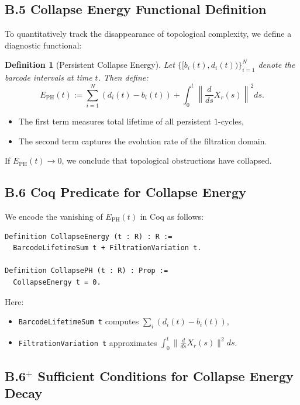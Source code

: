 \documentclass[11pt]{article}
\newtheorem{definition}[theorem]{Definition}
\begin{document}
\subsection{B.5 Collapse Energy Functional Definition}

To quantitatively track the disappearance of topological complexity, we define a diagnostic functional:

\begin{definition}[Persistent Collapse Energy]
Let $\{ [b_i(t), d_i(t)) \}_{i=1}^N$ denote the barcode intervals at time $t$. Then define:
\[
E_{\mathrm{PH}}(t) := \sum_{i=1}^N (d_i(t) - b_i(t)) + \int_0^t \left\| \frac{d}{ds} X_r(s) \right\|^2 ds.
\]
\end{definition}

\begin{itemize}
  \item The first term measures total lifetime of all persistent $1$-cycles,
  \item The second term captures the evolution rate of the filtration domain.
\end{itemize}

If $E_{\mathrm{PH}}(t) \to 0$, we conclude that topological obstructions have collapsed.

\subsection{B.6 Coq Predicate for Collapse Energy}

We encode the vanishing of $E_{\mathrm{PH}}(t)$ in Coq as follows:

\begin{lstlisting}[language=Coq, caption=Persistent Collapse Energy Predicate]
Definition CollapseEnergy (t : R) : R :=
  BarcodeLifetimeSum t + FiltrationVariation t.

Definition CollapsePH (t : R) : Prop :=
  CollapseEnergy t = 0.
\end{lstlisting}

\noindent
Here:
\begin{itemize}
  \item \texttt{BarcodeLifetimeSum t} computes $\sum_i (d_i(t) - b_i(t))$,
  \item \texttt{FiltrationVariation t} approximates $\int_0^t \| \frac{d}{ds} X_r(s) \|^2 ds$.
\end{itemize}

\subsection{B.6$^{+}$ Sufficient Conditions for Collapse Energy Decay}
\label{sec:ph-energy-decay}
\end{document}
